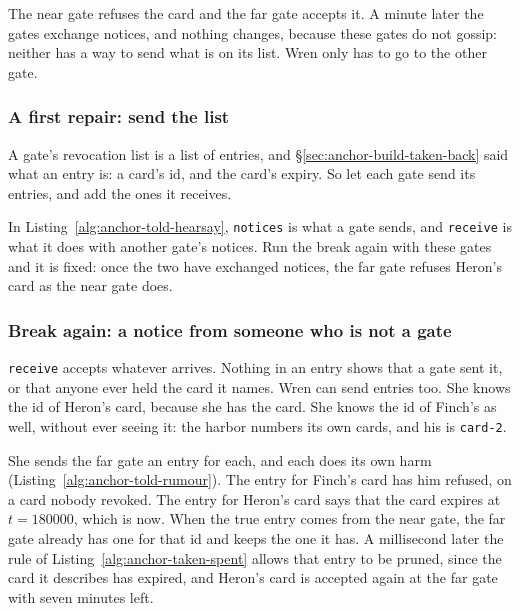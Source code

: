 The near gate refuses the card and the far gate accepts it. A minute later
the gates exchange notices, and nothing changes, because these gates do not
gossip: neither has a way to send what is on its list. Wren only has to go
to the other gate.

\subsubsection{A first repair: send the list}

A gate's revocation list is a list of entries, and
\S\ref{sec:anchor-build-taken-back} said what an entry is: a card's id,
and the card's expiry. So let each gate send its entries, and
add the ones it receives.

In Listing~\ref{alg:anchor-told-hearsay}, \texttt{notices} is what a gate
sends, and \texttt{receive} is what it does with another gate's notices. Run
the break again with these gates and it is fixed: once the two have exchanged
notices, the far gate refuses Heron's card as the near gate does.


\subsubsection{Break again: a notice from someone who is not a gate}

\texttt{receive} accepts whatever arrives. Nothing in an entry shows that a
gate sent it, or that anyone ever held the card it names. Wren can send
entries too. She knows the id of Heron's card, because she has the card.
She knows the id of Finch's as well, without ever seeing it: the harbor
numbers its own cards, and his is \texttt{card-2}.

She sends the far gate an entry for each, and each does its own harm
(Listing~\ref{alg:anchor-told-rumour}). The entry for Finch's card has
him refused, on a card nobody revoked. The entry for Heron's card says
that the card expires at $t=180000$, which is now. When the true entry
comes from the near gate, the far gate already has one for that id and
keeps the one it has. A millisecond later the rule of
Listing~\ref{alg:anchor-taken-spent} allows that entry to be pruned, since
the card it describes has expired, and Heron's card is accepted again at
the far gate with seven minutes left.


